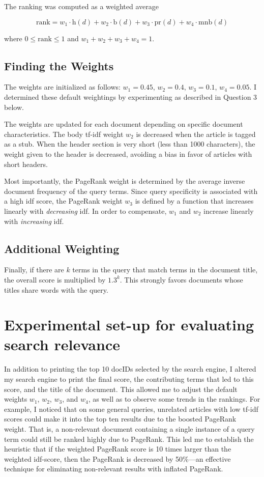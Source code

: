 \documentclass[11pt]{article}
\begin{document}
The ranking was computed as a weighted average

\[\text{rank} = w_{1} \cdot \text{h}(d) + w_{2} \cdot \text{b}(d) + w_{3} \cdot \text{pr}(d) + w_{4} \cdot \text{mnb}(d)\]

where $0 \leq \text{rank} \leq 1$ and $w_{1} + w_{2} + w_{3} + w_{4} = 1$.

\subsection*{Finding the Weights}

The weights are initialized as follows: $w_{1} = 0.45$, $w_{2} = 0.4$, $w_{3} = 0.1$, $w_{4} = 0.05$. I determined these
default weightings by experimenting as described in Question 3 below.

The weights are updated for each document depending on specific document characteristics. The body tf-idf weight $w_{2}$ is decreased
when the article is tagged as a stub. When the header section is very short (less than 1000 characters), the weight given to the header
is decreased, avoiding a bias in favor of articles with short headers.

Most importantly, the PageRank weight is determined by the average inverse document frequency of the query terms. Since query specificity is
associated with a high idf score, the PageRank weight $w_{3}$ is defined by a function that increases linearly with \textit{decreasing} idf. In order to compensate, $w_{1}$ and
$w_{2}$ increase linearly with \textit{increasing} idf.

\subsection*{Additional Weighting}

Finally, if there are $k$ terms in the query that match terms in the document title, the overall score is multiplied by $1.3^{k}$.
This strongly favors documents whose titles share words with the query.

\section{Experimental set-up for evaluating search relevance}

In addition to printing the top 10 docIDs selected by the search engine, I altered
my search engine to print the final score, the contributing terms that led to this score,
and the title of the document. This allowed me to adjust the default weights $w_{1}$, $w_{2}$,
$w_{3}$, and $w_{4}$, as well as to observe some trends in the rankings. For example, I noticed
that on some general queries, unrelated articles with low tf-idf scores could make it into
the top ten results due to the boosted PageRank weight. That is, a non-relevant document
containing a single instance of a query term could still be ranked highly due to PageRank.
This led me to establish the heuristic that if the
weighted PageRank score is 10 times larger than the weighted idf-score, then the PageRank is
decreased by 50\%---an effective technique for eliminating non-relevant results with inflated
PageRank.
\end{document}
